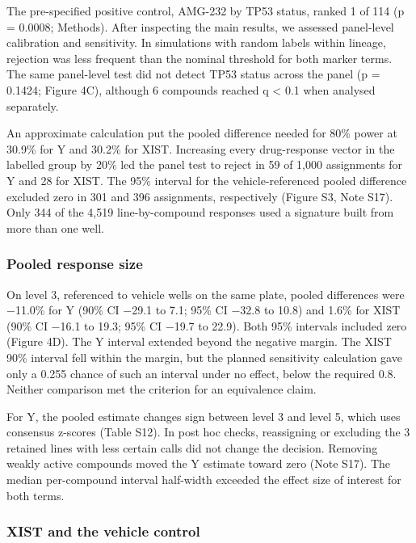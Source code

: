 \documentclass[
  11pt,
  letterpaper,
]{article}
\begin{document}
The pre-specified positive control, AMG-232 by TP53 status, ranked 1 of
114 (p = 0.0008; Methods). After inspecting the main results, we
assessed panel-level calibration and sensitivity. In simulations with
random labels within lineage, rejection was less frequent than the
nominal threshold for both marker terms. The same panel-level test did
not detect TP53 status across the panel (p = 0.1424; Figure 4C),
although 6 compounds reached q \textless{} 0.1 when analysed separately.

An approximate calculation put the pooled difference needed for 80\%
power at 30.9\% for Y and 30.2\% for XIST. Increasing every drug-response
vector in the labelled group by 20\% led the panel test to reject in
59 of 1,000 assignments for Y and 28 for XIST. The 95\% interval for the
vehicle-referenced pooled difference excluded zero in 301 and 396
assignments, respectively (Figure S3, Note S17). Only
344 of the 4,519 line-by-compound responses used a signature built from
more than one well.

\subsubsection{Pooled response size}\label{pooled-response-size}

On level 3, referenced to vehicle wells on the same plate, pooled
differences were −11.0\% for Y (90\% CI −29.1 to 7.1; 95\% CI −32.8 to
10.8) and 1.6\% for XIST (90\% CI −16.1 to 19.3; 95\% CI −19.7 to 22.9).
Both 95\% intervals included zero (Figure 4D). The Y interval extended
beyond the negative margin. The XIST 90\% interval fell within the
margin, but the planned sensitivity calculation gave only a 0.255 chance
of such an interval under no effect, below the required 0.8. Neither
comparison met the criterion for an equivalence claim.

For Y, the pooled estimate changes sign between level 3 and level 5,
which uses consensus z-scores (Table S12). In post hoc checks,
reassigning or excluding the 3 retained lines with less certain calls
did not change the decision. Removing weakly active compounds moved the
Y estimate toward zero (Note S17). The median per-compound interval
half-width exceeded the effect size of interest for both terms.

\subsubsection{XIST and the vehicle
control}\label{xist-and-the-vehicle-control}
\end{document}
